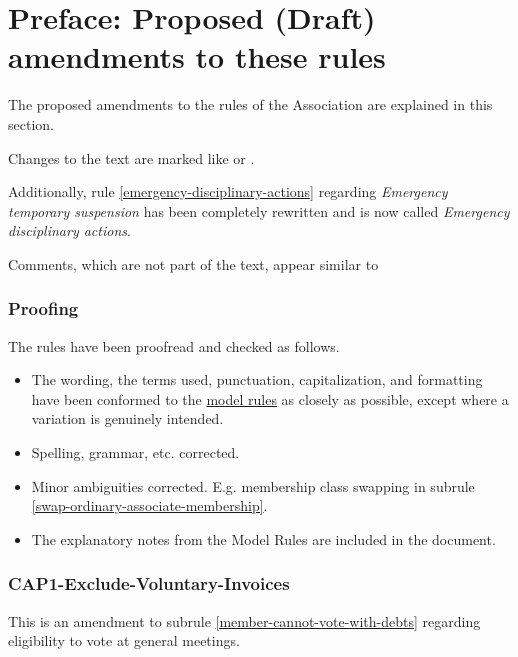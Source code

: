 \documentclass[../constitution.tex]{subfiles}
\begin{document}
\part*{Preface: Proposed (Draft) amendments to these rules}


The proposed amendments to the rules of the Association are explained in this section.

Changes to the text are marked like  or .

Additionally, rule \ref{emergency-disciplinary-actions} regarding \textit{Emergency temporary suspension} has been completely rewritten and is now called \textit{Emergency disciplinary actions}.

Comments, which are not part of the text, appear similar to 

\section*{Proofing}

The rules have been proofread and checked as follows.

\begin{itemize}
    \item The wording, the terms used, punctuation, capitalization, and formatting have been conformed to the \href{https://www.commerce.wa.gov.au/consumer-protection/model-rules}{model rules} as closely as possible, except where a variation is genuinely intended.
    \item Spelling, grammar, etc. corrected.
    \item Minor ambiguities corrected. E.g. membership class swapping in subrule \ref{swap-ordinary-associate-membership}.
    \item The explanatory notes from the Model Rules are included in the document.
\end{itemize}

\section*{CAP1-Exclude-Voluntary-Invoices}

This is an amendment to subrule \ref{member-cannot-vote-with-debts} regarding eligibility to vote at general meetings.
\end{document}
